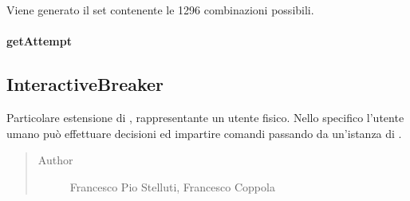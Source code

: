 \documentclass[letterpaper,10pt,italian,openany,oneside]{sphinxmanual}
\begin{document}
\begin{fulllineitems}
\label{\detokenize{source/it/unicam/cs/pa/mastermind/players/DonaldKnuthBreaker:it.unicam.cs.pa.mastermind.players.DonaldKnuthBreaker.generateSet()}}
Viene generato il set contenente le 1296 combinazioni possibili.

\end{fulllineitems}



\paragraph{getAttempt}
\label{\detokenize{source/it/unicam/cs/pa/mastermind/players/DonaldKnuthBreaker:getattempt}}

\begin{fulllineitems}
\label{\detokenize{source/it/unicam/cs/pa/mastermind/players/DonaldKnuthBreaker:it.unicam.cs.pa.mastermind.players.DonaldKnuthBreaker.getAttempt()}}
\end{fulllineitems}



\subsection{InteractiveBreaker}
\label{\detokenize{source/it/unicam/cs/pa/mastermind/players/InteractiveBreaker:interactivebreaker}}\label{\detokenize{source/it/unicam/cs/pa/mastermind/players/InteractiveBreaker::doc}}

\begin{fulllineitems}
\label{\detokenize{source/it/unicam/cs/pa/mastermind/players/InteractiveBreaker:it.unicam.cs.pa.mastermind.players.InteractiveBreaker}}
Particolare estensione di , rappresentante un utente fisico. Nello specifico l’utente umano può effettuare decisioni ed impartire comandi passando da un’istanza di .
\begin{quote}\begin{description}
\item[{Author}] \leavevmode
Francesco Pio Stelluti, Francesco Coppola

\end{description}\end{quote}

\end{fulllineitems}
\end{document}
